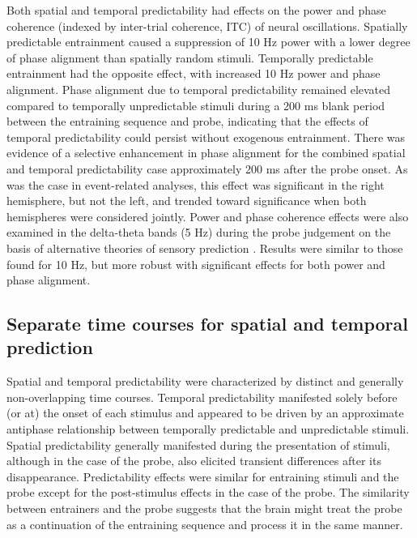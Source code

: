 \documentclass[dwyatte_dissertation.tex]{subfiles}
\begin{document}
Both spatial and temporal predictability had effects on the power and phase coherence (indexed by inter-trial coherence, ITC) of neural oscillations. Spatially predictable entrainment caused a suppression of 10 Hz power with a lower degree of phase alignment than spatially random stimuli. Temporally predictable entrainment had the opposite effect, with increased 10 Hz power and phase alignment. Phase alignment due to temporal predictability remained elevated compared to temporally unpredictable stimuli during a 200 ms blank period between the entraining sequence and probe, indicating that the effects of temporal predictability could persist without exogenous entrainment. There was evidence of a selective enhancement in phase alignment for the combined spatial and temporal predictability case approximately 200 ms after the probe onset. As was the case in event-related analyses, this effect was significant in the right hemisphere, but not the left, and trended toward significance when both hemispheres were considered jointly. Power and phase coherence effects were also examined in the delta-theta bands (5 Hz) during the probe judgement on the basis of alternative theories of sensory prediction \cite{ArnalGiraud12,GiraudPoeppel12}. Results were similar to those found for 10 Hz, but more robust with significant effects for both power and phase alignment. 

\subsection{Separate time courses for spatial and temporal prediction}
Spatial and temporal predictability were characterized by distinct and generally non-overlapping time courses. Temporal predictability manifested solely before (or at) the onset of each stimulus and appeared to be driven by an approximate antiphase relationship between temporally predictable and unpredictable stimuli. Spatial predictability generally manifested during the presentation of stimuli, although in the case of the probe, also elicited transient differences after its disappearance. Predictability effects were similar for entraining stimuli and the probe except for the post-stimulus effects in the case of the probe. The similarity between entrainers and the probe suggests that the brain might treat the probe as a continuation of the entraining sequence and process it in the same manner. 
\end{document}
